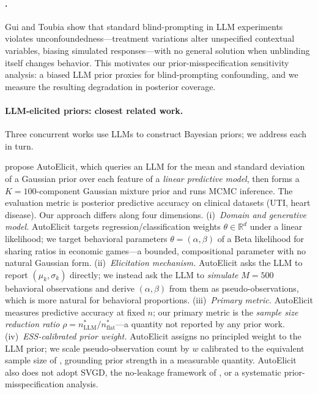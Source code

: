 \documentclass[11pt]{article}
\begin{document}
\paragraph{\citet{gui2025challenge}.}
Gui and Toubia show that standard blind-prompting in LLM experiments
violates unconfoundedness---treatment variations alter unspecified
contextual variables, biasing simulated responses---with no general
solution when unblinding itself changes behavior.
This motivates our prior-misspecification sensitivity analysis: a
biased LLM prior proxies for blind-prompting confounding, and we
measure the resulting degradation in posterior coverage.

\paragraph{LLM-elicited priors: closest related work.}
Three concurrent works use LLMs to construct Bayesian priors; we
address each in turn.

\citet{capstick2024autoelicit} propose AutoElicit, which queries an
LLM for the mean and standard deviation of a Gaussian prior over each
feature of a \emph{linear predictive model}, then forms a
$K{=}100$-component Gaussian mixture prior and runs MCMC inference.
The evaluation metric is posterior predictive accuracy on clinical
datasets (UTI, heart disease).
Our approach differs along four dimensions.
(i)~\textit{Domain and generative model.}
AutoElicit targets regression/classification weights $\theta \in
\mathbb{R}^d$ under a linear likelihood; we target behavioral
parameters $\theta = (\alpha,\beta)$ of a Beta likelihood for sharing
ratios in economic games---a bounded, compositional parameter with no
natural Gaussian form.
(ii)~\textit{Elicitation mechanism.}
AutoElicit asks the LLM to report $(\mu_k, \sigma_k)$ directly;
we instead ask the LLM to \emph{simulate} $M{=}500$ behavioral
observations and derive $(\alpha,\beta)$ from them as
pseudo-observations, which is more natural for behavioral proportions.
(iii)~\textit{Primary metric.}
AutoElicit measures predictive accuracy at fixed $n$; our primary
metric is the \emph{sample size reduction ratio}
$\rho = n^*_{\mathrm{LLM}}/n^*_{\mathrm{flat}}$---a quantity not
reported by any prior work.
(iv)~\textit{ESS-calibrated prior weight.}
AutoElicit assigns no principled weight to the LLM prior; we scale
pseudo-observation count by $w$ calibrated to the equivalent sample
size of \citet{gao2026measure}, grounding prior strength in a
measurable quantity.
AutoElicit also does not adopt SVGD, the no-leakage framework of
\citet{ludwig2025econometrics}, or a systematic prior-misspecification
analysis.
\end{document}
